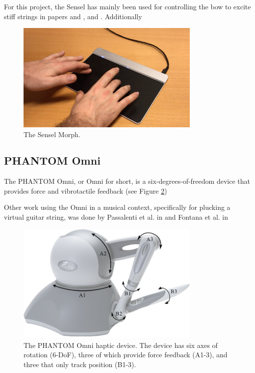 For this project, the Sensel has mainly been used for controlling the bow to excite stiff strings  in papers \citeP[A] and \citeP[B], \citeP[C] and \citeP[D]. Additionally

\begin{figure}[h]
    \centering
    \includegraphics[width=0.8\textwidth]{figures/contributions/realtime/senselHands.jpg}
    \caption{The Sensel Morph. \label{fig:sensel}}
\end{figure}



\subsection{PHANTOM Omni}\label{sec:phantomOmni}
The PHANTOM Omni, or Omni for short, is a six-degrees-of-freedom device that provides force and vibrotactile feedback (see Figure \ref{fig:omni})

Other work using the Omni in a musical context, specifically for plucking a virtual guitar string, was done by Passalenti et al. in \cite{passalenti2019a, passalenti2019b} and Fontana et al. in \cite{Fontana2020}

\begin{figure}[h]\includegraphics[width=0.8\textwidth]{figures/contributions/realtime/omniSchematic.png}
    \centering
      \caption{The PHANTOM Omni haptic device. The device has six axes of rotation (6-DoF), three of which provide force feedback (A1-3), and three that only track position (B1-3). \label{fig:omni}}
\end{figure}

